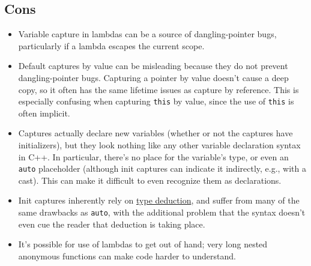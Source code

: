 \subsection{Cons}
\begin{itemize}
\item Variable capture in lambdas can be a source of dangling-pointer bugs, particularly if a lambda escapes the current scope.
\item Default captures by value can be misleading because they do not prevent dangling-pointer bugs. Capturing a pointer by value doesn't cause a deep copy, so it often has the same lifetime issues as capture by reference. This is especially confusing when capturing \texttt{this} by value, since the use of \texttt{this} is often implicit.
\item Captures actually declare new variables (whether or not the captures have initializers), but they look nothing like any other variable declaration syntax in C++. In particular, there's no place for the variable's type, or even an \texttt{auto} placeholder (although init captures can indicate it indirectly, e.g., with a cast). This can make it difficult to even recognize them as declarations.
\item Init captures inherently rely on \hyperref[sec:type-deduction-(including-auto)]{type deduction}, and suffer from many of the same drawbacks as \texttt{auto}, with the additional problem that the syntax doesn't even cue the reader that deduction is taking place.
\item It's possible for use of lambdas to get out of hand; very long nested anonymous functions can make code harder to understand.
\end{itemize}

